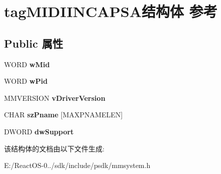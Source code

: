 \hypertarget{structtag_m_i_d_i_i_n_c_a_p_s_a}{}\section{tag\+M\+I\+D\+I\+I\+N\+C\+A\+P\+S\+A结构体 参考}
\label{structtag_m_i_d_i_i_n_c_a_p_s_a}
\subsection*{Public 属性}
\begin{DoxyCompactItemize}
\item 
\mbox{\label{structtag_m_i_d_i_i_n_c_a_p_s_a_afd94c0e77d43282065d5fc6d131c929a}} 
W\+O\+RD {\bfseries w\+Mid}
\item 
\mbox{\label{structtag_m_i_d_i_i_n_c_a_p_s_a_aea56c3f901442ed0d0f2e8c2ef0b1636}} 
W\+O\+RD {\bfseries w\+Pid}
\item 
\mbox{\label{structtag_m_i_d_i_i_n_c_a_p_s_a_ac749a6c5ec0a526d0c926f0b93de4c5e}} 
M\+M\+V\+E\+R\+S\+I\+ON {\bfseries v\+Driver\+Version}
\item 
\mbox{\label{structtag_m_i_d_i_i_n_c_a_p_s_a_af297de695a30748e127d056cd108fa21}} 
C\+H\+AR {\bfseries sz\+Pname} \mbox{[}M\+A\+X\+P\+N\+A\+M\+E\+L\+EN\mbox{]}
\item 
\mbox{\label{structtag_m_i_d_i_i_n_c_a_p_s_a_abc20ca3506c9d0a3e97b1e422699d8ee}} 
D\+W\+O\+RD {\bfseries dw\+Support}
\end{DoxyCompactItemize}


该结构体的文档由以下文件生成\+:\begin{DoxyCompactItemize}
\item 
E\+:/\+React\+O\+S-\/0../sdk/include/psdk/mmsystem.\+h\end{DoxyCompactItemize}
